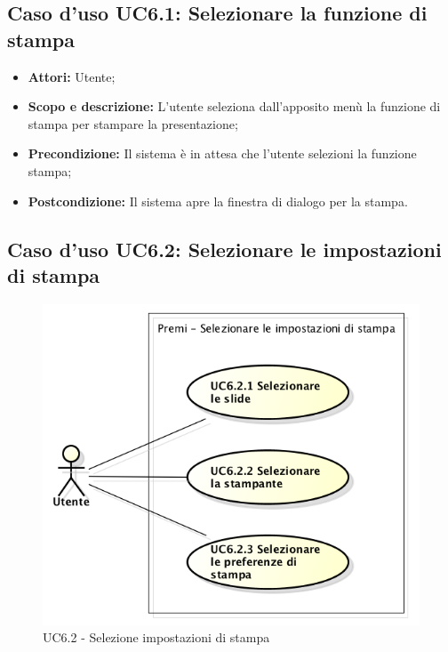 \subsection{Caso d'uso UC6.1: Selezionare la funzione di stampa}
\begin{itemize}
	\item \textbf{Attori:} Utente;
	\item \textbf{Scopo e descrizione:} L'utente seleziona dall'apposito menù la funzione di stampa per stampare la presentazione;
	\item \textbf{Precondizione:} Il sistema è in attesa che l'utente selezioni la funzione stampa;
	\item \textbf{Postcondizione:} Il sistema apre la finestra di dialogo per la stampa.
\end{itemize}

\subsection{Caso d'uso UC6.2: Selezionare le impostazioni di stampa}
\begin{figure}[h] 
	\centering 
	\includegraphics[scale=0.45] {img/UC6.2.png} 
	\caption{UC6.2 - Selezione impostazioni di stampa} 
\end{figure}

